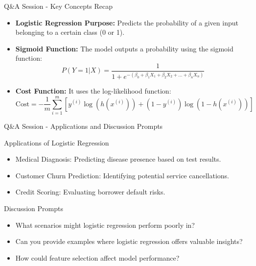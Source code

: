 \documentclass[aspectratio=169]{beamer}
\begin{document}
\begin{frame}[fragile]{Q\&A Session - Key Concepts Recap}
  \begin{itemize}
    \item \textbf{Logistic Regression Purpose:} Predicts the probability of a given input belonging to a certain class (0 or 1).
    
    \item \textbf{Sigmoid Function:} The model outputs a probability using the sigmoid function:
    \begin{equation}
      P(Y=1 | X) = \frac{1}{1 + e^{-(\beta_0 + \beta_1X_1 + \beta_2X_2 + \ldots + \beta_nX_n)}}
    \end{equation}
    
    \item \textbf{Cost Function:} It uses the log-likelihood function:
    \begin{equation}
      \text{Cost} = -\frac{1}{m} \sum_{i=1}^{m} [y^{(i)} \log(h(x^{(i)})) + (1-y^{(i)}) \log(1-h(x^{(i)}))]
    \end{equation}
  \end{itemize}
\end{frame}

\begin{frame}[fragile]{Q\&A Session - Applications and Discussion Prompts}
  \begin{block}{Applications of Logistic Regression}
    \begin{itemize}
      \item Medical Diagnosis: Predicting disease presence based on test results.
      \item Customer Churn Prediction: Identifying potential service cancellations.
      \item Credit Scoring: Evaluating borrower default risks.
    \end{itemize}
  \end{block}

  \begin{block}{Discussion Prompts}
    \begin{itemize}
      \item What scenarios might logistic regression perform poorly in?
      \item Can you provide examples where logistic regression offers valuable insights?
      \item How could feature selection affect model performance?
    \end{itemize}
  \end{block}
\end{frame}
\end{document}

